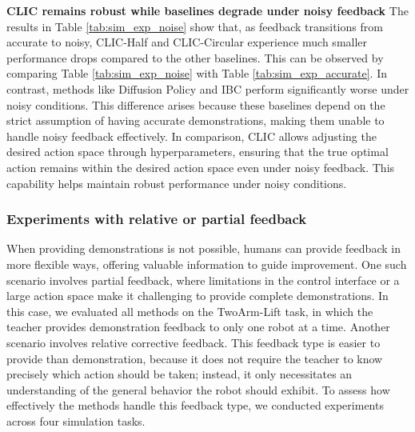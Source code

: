 
\textbf{CLIC remains robust while baselines degrade under noisy feedback}
The results in Table \ref{tab:sim_exp_noise} show that, as feedback transitions from accurate to noisy, CLIC-Half and CLIC-Circular experience much smaller performance drops compared to the other baselines.
This can be observed by comparing Table \ref{tab:sim_exp_noise} with Table \ref{tab:sim_exp_accurate}.
In contrast, methods like Diffusion Policy and IBC perform significantly worse under noisy conditions.
This difference arises because these baselines depend on the strict assumption of having accurate demonstrations, making them unable to handle noisy feedback effectively. In comparison, CLIC allows adjusting the desired action space through hyperparameters, ensuring that the true optimal action remains within the desired action space even under noisy feedback.
This capability helps maintain robust performance under noisy conditions. 

\subsubsection{Experiments with relative or partial feedback}
\label{sec:exp:simulation_relative_partial}
When providing demonstrations is not possible, humans can provide feedback in more flexible ways, offering valuable information to guide improvement.
One such scenario involves partial feedback, where limitations in the control interface or a large action space make it challenging to provide complete demonstrations. In this case, we evaluated all methods on the TwoArm-Lift task, in which the teacher provides demonstration feedback to only one robot at a time.
Another scenario involves relative corrective feedback.
This feedback type is easier to provide than demonstration, because it does not require the teacher to know precisely which action should be taken; instead, it only necessitates an understanding of the general behavior the robot should exhibit.
To assess how effectively the methods handle this feedback type, we conducted experiments across four simulation tasks.


